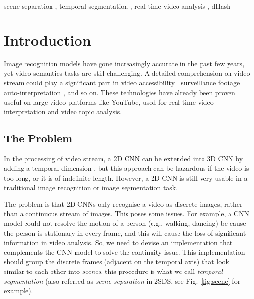\documentclass[
twocolumn,
]{ceurart}
\begin{document}
\begin{keywords}
  scene separation \sep
  temporal segmentation \sep
  real-time video analysis \sep
  dHash
\end{keywords}

\maketitle

\section{Introduction}
Image recognition models have gone increasingly accurate in the past few years, yet video semantics tasks are still challenging. A detailed comprehension on video stream could play a significant part in video accessibility \cite{DBLP:journals/expert/StappenBCSC21}, surveillance footage auto-interpretation \cite{DBLP:journals/mta/PatelV0O22,DBLP:journals/csur/PalSDKRP21}, and so on. These technologies have already been proven useful on large video platforms like YouTube, used for real-time video interpretation and video topic analysis.
\subsection{The Problem}
In the processing of video stream, a 2D CNN can be extended into 3D CNN by adding a temporal dimension \cite{DBLP:journals/corr/abs-1711-08200}, but this approach can be hazardous if the video is too long, or it is of indefinite length. However, a 2D CNN is still very usable in a traditional image recognition or image segmentation task.

The problem is that 2D CNNs only recognise a video as discrete images, rather than a continuous stream of images. This poses some issues. For example, a CNN model could not resolve the motion of a person (e.g., walking, dancing) be-cause the person is stationary in every frame, and this will cause the 
loss of significant information in video analysis. So, we need to devise an implementation that complements the CNN model to solve the continuity issue. This implementation should group the discrete frames (adjacent on the temporal axis) that look similar to each other into \emph{scenes}, this procedure is what we call \emph{temporal segmentation} (also referred as \emph{scene separation} in 2SDS, see Fig.~\ref{fig:scene} for example).
\end{document}
